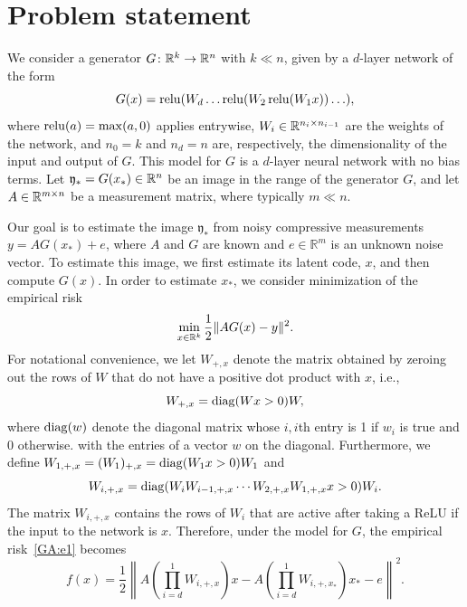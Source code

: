 \section{Problem statement}

We consider a generator
$G\colon \mathbb{R}^k \to \mathbb{R}^n$ with $k \ll n$, given by a $d$-layer network of the form
$$
G(x) = \operatorname{\mathrm{relu}}(W_d \ldots \operatorname{\mathrm{relu}}(W_2 \operatorname{\mathrm{relu}}( W_1 x)) \ldots ),
$$
where $\operatorname{\mathrm{relu}}(a) = \max(a, 0)$ applies entrywise, $W_i \in \mathbb{R}^{n_i \times n_{i - 1}}$ are the weights of the network,  and $n_0 = k$ and $n_d=n$ are, respectively, the dimensionality of the input and output of $G$.  This model for $G$ is a $d$-layer neural network with no bias terms.
Let $\mathfrak{y}_* = G(x_*) \in \mathbb{R}^n$ be an image in the range of the generator $G$,  and let $A \in \mathbb{R}^{m \times n}$ be a measurement matrix, where typically $m \ll n$.

Our goal is to estimate the image $\mathfrak{y}_*$ from noisy compressive measurements $y = A G(x_*) + e$, where $A$ and $G$ are known and $e \in \mathbb{R}^m$ is an unknown noise vector.  To estimate this image, we first estimate its latent code, $x$, and then compute $G(x)$.
In order to estimate  $x_*$, we consider  minimization of  the empirical risk
\begin{equation}
\min_{x \in \mathbb{R}^k} \frac{1}{2}\|A G(x) - y\|^2. \label{GA:e1}
\end{equation}
For notational convenience, we let $W_{+, x}$ denote the matrix obtained by zeroing out the rows of $W$ that do not have a positive dot product with $x$, i.e.,
$$
W_{+, x} = \operatorname{\mathrm{diag}}(W x > 0) W,
$$
where $\operatorname{\mathrm{diag}}(w)$ denote the diagonal matrix whose $i,i$th entry is 1 if $w_i$ is true and 0 otherwise. with the entries of a vector $w$ on the diagonal.
Furthermore, we define $W_{1, +, x} = (W_1)_{+, x} = \operatorname{\mathrm{diag}}(W_1 x > 0) W_1$ and
$$
W_{i, +, x} = \operatorname{\mathrm{diag}}(W_i W_{i - 1, +, x} \cdots W_{2, +, x} W_{1, +, x} x > 0) W_i.
$$
The matrix $W_{i,+,x}$ contains the rows of $W_i$ that are active after taking a ReLU if  the input to the network is $x$.
Therefore, under the model for $G$, the empirical risk~\eqref{GA:e1} becomes
\begin{equation} \label{GA:e2}
f(x) = \frac{1}{2} \left\| A \left(\prod_{i = d}^1 W_{i, +, x}\right) x - A \left(\prod_{i = d}^1 W_{i, +, x_*}\right) x_* - e \right\|^2.
\end{equation}

